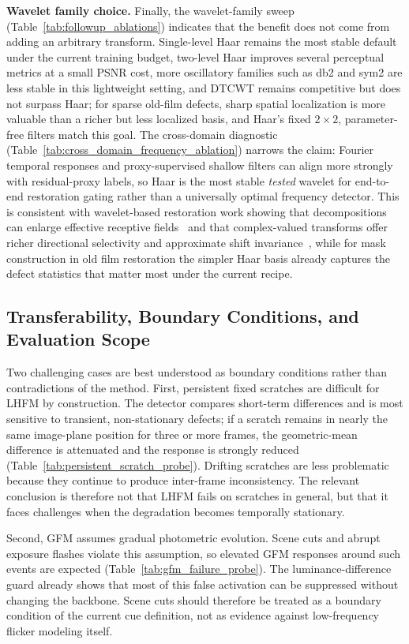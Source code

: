 \documentclass[applsci,article,submit,pdftex,moreauthors]{Definitions/mdpi}
\begin{document}
\textbf{Wavelet family choice.}
Finally, the wavelet-family sweep (Table~\ref{tab:followup_ablations}) indicates that the benefit does not come from adding an arbitrary transform. Single-level Haar remains the most stable default under the current training budget, two-level Haar improves several perceptual metrics at a small PSNR cost, more oscillatory families such as db2 and sym2 are less stable in this lightweight setting, and DTCWT remains competitive but does not surpass Haar; for sparse old-film defects, sharp spatial localization is more valuable than a richer but less localized basis, and Haar's fixed $2\times2$, parameter-free filters match this goal. The cross-domain diagnostic (Table~\ref{tab:cross_domain_frequency_ablation}) narrows the claim: Fourier temporal responses and proxy-supervised shallow filters can align more strongly with residual-proxy labels, so Haar is the most stable \emph{tested} wavelet for end-to-end restoration gating rather than a universally optimal frequency detector. This is consistent with wavelet-based restoration work showing that decompositions can enlarge effective receptive fields~\cite{liu2018mwcnn} and that complex-valued transforms offer richer directional selectivity and approximate shift invariance~\cite{selesnick2005dual}, while for mask construction in old film restoration the simpler Haar basis already captures the defect statistics that matter most under the current recipe.

\subsection{Transferability, Boundary Conditions, and Evaluation Scope}\label{subsec:transferability}

Two challenging cases are best understood as boundary conditions rather than contradictions of the method. First, persistent fixed scratches are difficult for LHFM by construction. The detector compares short-term differences and is most sensitive to transient, non-stationary defects; if a scratch remains in nearly the same image-plane position for three or more frames, the geometric-mean difference is attenuated and the response is strongly reduced (Table~\ref{tab:persistent_scratch_probe}). Drifting scratches are less problematic because they continue to produce inter-frame inconsistency. The relevant conclusion is therefore not that LHFM fails on scratches in general, but that it faces challenges when the degradation becomes temporally stationary.

Second, GFM assumes gradual photometric evolution. Scene cuts and abrupt exposure flashes violate this assumption, so elevated GFM responses around such events are expected (Table~\ref{tab:gfm_failure_probe}). The luminance-difference guard already shows that most of this false activation can be suppressed without changing the backbone. Scene cuts should therefore be treated as a boundary condition of the current cue definition, not as evidence against low-frequency flicker modeling itself.
\end{document}
